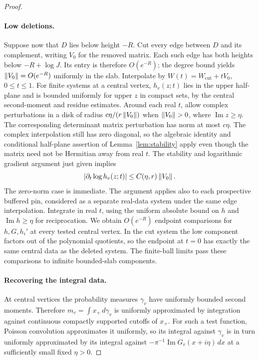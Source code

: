 \begin{proof}
\paragraph{Low deletions.}
Suppose now that $D$ lies below height $-R$. Cut every edge between
$D$ and its complement, writing $V_0$ for the removed matrix. Each
such edge has both heights below $-R+\log J$. Its entry is therefore
$O(e^{-R})$; the degree bound yields
$\left\lVert V_0\right\rVert=O(e^{-R})$ uniformly in the slab. Interpolate by
$W(t)=W_{\mathrm{cut}}+tV_0$, $0\leq t\leq1$.
For finite systems at a central vertex, $h_v(z;t)$ lies in the upper
half-plane and is bounded uniformly for upper $z$ in compact sets,
by the central second-moment and residue estimates. Around each real
$t$, allow complex perturbations in a disk of radius
$c\eta/(r\left\lVert V_0\right\rVert)$ when $\left\lVert V_0\right\rVert>0$, where
$\operatorname{Im}z\geq\eta$. The corresponding determinant matrix
perturbation has norm at most $c\eta$. The complex interpolation still
has zero diagonal, so the algebraic identity and conditional half-plane
assertion of Lemma~\ref{lem:stability} apply even though the matrix need
not be Hermitian away from real $t$. The stability and logarithmic
gradient argument just given implies
\[
 \left|\partial_t\log h_v(z;t)\right|
 \leq C(\eta,r)\left\lVert V_0\right\rVert.
\]
The zero-norm case is immediate. The argument applies also to each
prospective buffered pin, considered as a separate real-data system
under the same edge interpolation. Integrate in real $t$, using the
uniform absolute bound on $h$ and
$\operatorname{Im}h\geq\eta$ for reciprocation. We obtain
$O(e^{-R})$ endpoint comparisons for $h,G,h_i'$ at every tested central
vertex. In the cut system the low component factors out of the
polynomial quotients, so the endpoint at $t=0$ has exactly the same
central data as the deleted system. The finite-ball limits pass these
comparisons to infinite bounded-slab components.

\paragraph{Recovering the integral data.}
At central vertices the probability measures $\gamma_v$ have uniformly
bounded second moments. Therefore $m_v=\int x_+\,d\gamma_v$ is uniformly
approximated by integration against continuous compactly supported
cutoffs of $x_+$. For such a test function, Poisson convolution
approximates it uniformly, so its integral against $\gamma_v$ is in
turn uniformly approximated by its integral against
$-\pi^{-1}\operatorname{Im}G_v(x+i\eta)\,dx$ at a sufficiently small
fixed $\eta>0$.


\end{proof}
